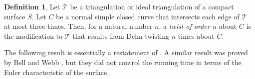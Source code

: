 \documentclass[oneside]{amsart}
\numberwithin{equation}{section}
\theoremstyle{plain}
\theoremstyle{definition}
\newtheorem{definition}[equation]{Definition}
\newcommand{\calT}{{\mathcal{T}}}
\newcommand{\calH}{\mathcal{H}}
\begin{document}


\begin{definition}
Let $\calT$ be a triangulation or ideal triangulation of a compact surface $S$. Let $C$ be a normal simple closed curve that intersects each edge of $\calT$ at most three times. Then, for a natural number $n$, a \emph{twist of order $n$} about $C$ is the modification to $\calT$ that results from Dehn twisting $n$ times about $C$.
\end{definition}

The following result is essentially a restatement of \cite[Theorems 7.4 and 7.5]{LackenbyYazdi}. A similar result was proved by Bell and Webb \cite[Corollary 3.5]{BellWebb}, but they did not control the running time in terms of the Euler characteristic of the surface.
\end{document}
